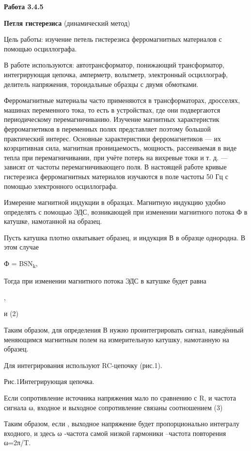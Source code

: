 \documentclass[]{article}
\date{}
\begin{document}
\textbf{Работа 3.4.5}

\protect\hypertarget{bookmark65}{}{}\textbf{Петля гистерезиса}
(динамический метод)

Цель работы: изучение петель гистерезиса ферромагнитных мате­риалов с
помощью осциллографа.

В работе используются: автотрансформатор, понижающий транс­форматор,
интегрирующая цепочка, амперметр, вольтметр, элек­тронный осциллограф,
делитель напряжения, тороидальные образцы с двумя обмотками.

Ферромагнитные материалы часто применяются в трансформато­рах,
дросселях, машинах переменного тока, то есть в устройствах, где они
подвергаются периодическому перемагничиванию. Изучение маг­нитных
характеристик ферромагнетиков в переменных полях представ­ляет поэтому
большой практический интерес. Основные характеристи­ки ферромагнетиков
--- их коэрцитивная сила, магнитная проницае­мость, мощность,
рассеиваемая в виде тепла при перемагничивании, при учёте потерь на
вихревые токи и т. д. --- зависят от частоты перемагничивающего поля. В
настоящей ра­боте кривые гистерезиса ферромагнитных материалов изучаются
в по­ле частоты 50 Гц с помощью электронного осциллографа.

Измерение магнитной индукции в образцах. Магнитную индук­цию удобно
определять с помощью ЭДС, возникающей при изменении магнитного потока Ф
в катушке, намотанной на образец.

Пусть катушка плотно охватывает образец, и индукция В в образце
однородна. В этом случае

Ф = BSN\textsubscript{k},

Тогда при изменении магнитного потока ЭДС в катушке будет равна

,

и (2)

Таким образом, для определения В нужно проинтегрировать сиг­нал,
наведённый меняющимся магнитным полем на измерительную ка­тушку,
намотанную на образец.

Для интегрирования используют RC-цепочку (рис.1).

Рис.1Интегрирующая цепочка.

Если сопротивление источника напряжения мало по сравнению с R, и частота
сигнала ω, входное и выходное сопротивление связаны соотношением (3)

Таким образом, если , выходное напряжение будет пропорционально
интегралу входного, и здесь ω -частота самой низкой гармоники --частота
повторения ω=2π/T.
\end{document}
